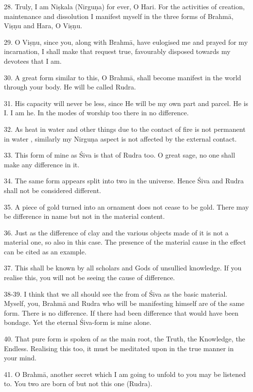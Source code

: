 28. Truly, I am Niṣkala (Nirguṇa) for ever, O Hari. For the activities of
creation, maintenance and dissolution I manifest myself in the three forms of
Brahmā, Viṣṇu and Hara, O Viṣṇu.

29. O Viṣṇu, since you, along with Brahmā, have eulogised me and prayed for my
incarnation, I shall make that request true, favourably disposed towards my
devotees that I am.

30. A great form similar to this, O Brahmā, shall become manifest in the world
through your body. He will be called Rudra.

31. His capacity will never be less, since He will be my own part and parcel. He
is I. I am he. In the modes of worship too there in no difference.

32. As heat \etc in water and other things due to the contact of fire is not
permanent in water \etc, similarly my Nirguṇa aspect is not affected by
the external contact.

33. This form of mine as Śiva is that of Rudra too. O great sage, no one shall
make any difference in it.

34. The same form appears split into two in the universe. Hence Śiva and Rudra
shall not be considered different.

35. A piece of gold turned into an ornament does not cease to be gold. There may
be difference in name but not in the material content.

36. Just as the difference of clay and the various objects made of it is not
a material one, so also in this case. The presence of the material cause in
the effect can be cited as an example.

37. This shall be known by all scholars and Gods of unsullied knowledge. If you
realise this, you will not be seeing the cause of difference.

38-39. I think that we all should see the from of Śiva as the basic material.
Myself, you, Brahmā and Rudra who will be manifesting himself are of the same
form. There is no difference. If there had been difference that would have been
bondage. Yet the eternal Śiva-form is mine alone.

40. That pure form is spoken of as the main root, the Truth, the Knowledge,
the Endless. Realising this too, it must be meditated upon in the true manner
in your mind.

41. O Brahmā, another secret which I am going to unfold to you may be listened
to. You two are born of  but not this one (Rudra).

